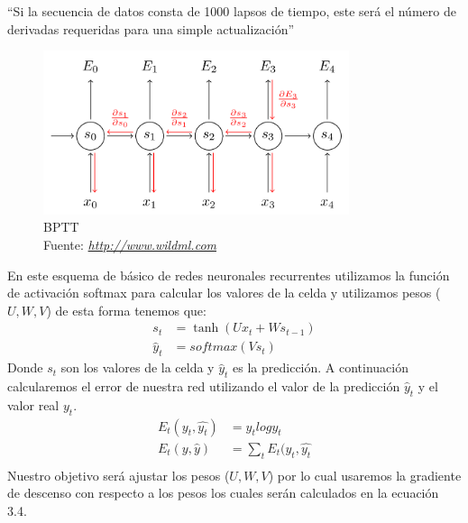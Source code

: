 \textquotedblleft Si la secuencia de datos consta de 1000 lapsos de tiempo, este será el número de derivadas requeridas para una simple actualización\textquotedblright \cite{WEBSITE:20}

\begin{figure}[H]
	\centering
	\includegraphics[width=0.8\textwidth]{Figures/BPTT1.png}
	\caption{BPTT \\ Fuente:  \href{http://www.wildml.com/2015/10/recurrent-neural-networks-tutorial-part-3-backpropagation-through-time-and-vanishing-gradients/}{\textit{http://www.wildml.com}}}
	\label{}
\end{figure}

En este esquema de básico de redes neuronales recurrentes utilizamos la función de activación softmax para calcular los valores de la celda y utilizamos pesos ($U,W,V$) de esta forma tenemos que:
\begin{equation}
	\label{ST}
	\begin{aligned}
	s_{t}&=\tanh(Ux_{t}+Ws_{t-1})\\
	\hat{y}_{t}&=softmax(Vs_{t})
	\end{aligned}
\end{equation}
Donde $s_{t}$ son los valores de la celda y $\hat{y}_{t}$ es la predicción. A continuación calcularemos el error de nuestra red utilizando el valor de la predicción $\hat{y}_{t}$ y el valor real $y_{t}$.
\begin{equation}
	\label{STs}
	\begin{aligned}
		E_{t}(y_{t},\hat{y_{t}})&=y_{t}logy_{t}\\
		E_{t}(y,\hat{y})&=\sum_{t}{E_{t}(y_{t},\hat{y_{t}}}\\
	\end{aligned}
\end{equation}
Nuestro objetivo será ajustar los pesos ($U,W,V$) por lo cual usaremos la gradiente de descenso con respecto a los pesos los cuales serán calculados en la ecuación 3.4.

